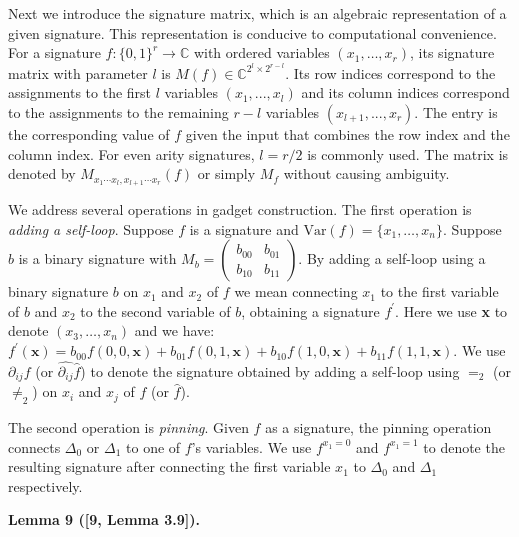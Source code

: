 \documentclass[10pt,a4paper]{article}
\begin{document}
Next we introduce the signature matrix, which is an algebraic representation of a given signature. This representation is conducive to computational convenience.
For a signature $f:\{0,1\}^{r}\to\mathbb{C}$ with ordered variables $(x_{1},\ldots,x_{r})$, its signature matrix with parameter $l$ is $M(f)\in\mathbb{C}^{2^{l}\times 2^{r-l}}$. Its row indices correspond to the assignments to the first $l$ variables $(x_{1},...,x_{l})$ and its column indices correspond to the assignments to the remaining $r-l$ variables $(x_{l+1},...,x_{r})$. The entry is the corresponding value of $f$ given the input that combines the row index and the column index. For even arity signatures, $l=r/2$ is commonly used. The matrix is denoted by $M_{x_{1}\cdots x_{l},x_{l+1}\cdots x_{r}}(f)$ or simply $M_{f}$ without causing ambiguity.\par




We address several operations in gadget construction. The first operation is \emph{adding a self-loop}. Suppose $f$ is a signature and $\text{Var}(f)=\{x_{1},\ldots,x_{n}\}$. Suppose $b$ is a binary signature with $M_{b}=\begin{pmatrix}b_{00}&b_{01}\\
b_{10}&b_{11}\end{pmatrix}$. By adding a self-loop using a binary signature $b$ on $x_{1}$ and $x_{2}$ of $f$ we mean connecting $x_{1}$ to the first variable of $b$ and $x_{2}$ to the second variable of $b$, obtaining a signature $f^{\prime}$. Here we use \textbf{x} to denote $(x_{3},\ldots,x_{n})$ and we have: $f^{\prime}(\textbf{x})=b_{00}f(0,0,\textbf{x})+b_{01}f(0,1,\textbf{x})+b_{10}f(1,0,\textbf{x})+b_{11}f(1,1,\textbf{x}).$ We use $\partial_{ij}f$ (or $\widehat{\partial_{ij}}\widehat{f}$) to denote the signature obtained by adding a self-loop using $=_{2}$ (or $\neq_{2}$) on $x_{i}$ and $x_{j}$ of $f$ (or $\widehat{f}$).\par




The second operation is \emph{pinning}. Given $f$ as a signature, the pinning operation connects $\Delta_{0}$ or $\Delta_{1}$ to one of $f$’s variables. We use $f^{x_{1}=0}$ and $f^{x_{1}=1}$ to denote the resulting signature after connecting the first variable $x_{1}$ to $\Delta_{0}$ and $\Delta_{1}$ respectively.\par





\par\medskip\noindent\textbf{
\textbf{Lemma 9}\textbf{ }([9, Lemma 3.9])\textbf{.}
}\par
\end{document}

